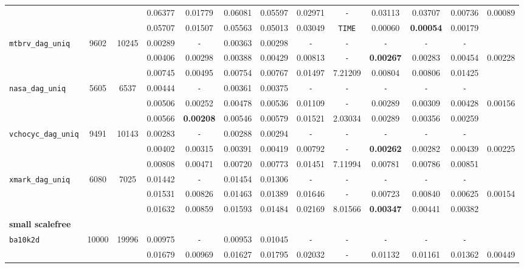 \begin{table}
{\begin{tabular}{ l c c | c c c c c c c c c || c }
 &  &  & 0.06377 & 0.01779 & 0.06081 & 0.05597 & 0.02971 & \verb|-| & 0.03113 & 0.03707 & 0.00736 & 0.00089 \\
 &  &  & 0.05707 & 0.01507 & 0.05563 & 0.05013 & 0.03049 & \verb|TIME| & 0.00060 & \textbf{0.00054} & 0.00179 & \\
\hline
\verb|mtbrv_dag_uniq| & 9602 & 10245 & 0.00289 & \verb|-| & 0.00363 & 0.00298 & \verb|-| & \verb|-| & \verb|-| & \verb|-| & \verb|-| & \\
 &  &  & 0.00406 & 0.00298 & 0.00388 & 0.00429 & 0.00813 & \verb|-| & \textbf{0.00267} & 0.00283 & 0.00454 & 0.00228 \\
 &  &  & 0.00745 & 0.00495 & 0.00754 & 0.00767 & 0.01497 & 7.21209 & 0.00804 & 0.00806 & 0.01425 & \\
\hline
\verb|nasa_dag_uniq| & 5605 & 6537 & 0.00444 & \verb|-| & 0.00361 & 0.00375 & \verb|-| & \verb|-| & \verb|-| & \verb|-| & \verb|-| & \\
 &  &  & 0.00506 & 0.00252 & 0.00478 & 0.00536 & 0.01109 & \verb|-| & 0.00289 & 0.00309 & 0.00428 & 0.00156 \\
 &  &  & 0.00566 & \textbf{0.00208} & 0.00546 & 0.00579 & 0.01521 & 2.03034 & 0.00289 & 0.00356 & 0.00259 & \\
\hline
\verb|vchocyc_dag_uniq| & 9491 & 10143 & 0.00283 & \verb|-| & 0.00288 & 0.00294 & \verb|-| & \verb|-| & \verb|-| & \verb|-| & \verb|-| & \\
 &  &  & 0.00402 & 0.00315 & 0.00391 & 0.00419 & 0.00792 & \verb|-| & \textbf{0.00262} & 0.00282 & 0.00439 & 0.00225 \\
 &  &  & 0.00808 & 0.00471 & 0.00720 & 0.00773 & 0.01451 & 7.11994 & 0.00781 & 0.00786 & 0.00851 & \\
\hline
\verb|xmark_dag_uniq| & 6080 & 7025 & 0.01442 & \verb|-| & 0.01454 & 0.01306 & \verb|-| & \verb|-| & \verb|-| & \verb|-| & \verb|-| & \\
 &  &  & 0.01531 & 0.00826 & 0.01463 & 0.01389 & 0.01646 & \verb|-| & 0.00723 & 0.00840 & 0.00625 & 0.00154 \\
 &  &  & 0.01632 & 0.00859 & 0.01593 & 0.01484 & 0.02169 & 8.01566 & \textbf{0.00347} & 0.00441 & 0.00382 & \\
\hline
\multicolumn{13}{l}{\textbf{small scalefree}} \\
\hline
\verb|ba10k2d| & 10000 & 19996 & 0.00975 & \verb|-| & 0.00953 & 0.01045 & \verb|-| & \verb|-| & \verb|-| & \verb|-| & \verb|-| & \\
 &  &  & 0.01679 & 0.00969 & 0.01627 & 0.01795 & 0.02032 & \verb|-| & 0.01132 & 0.01161 & 0.01362 & 0.00449 \\

\end{tabular}}
\end{table}
